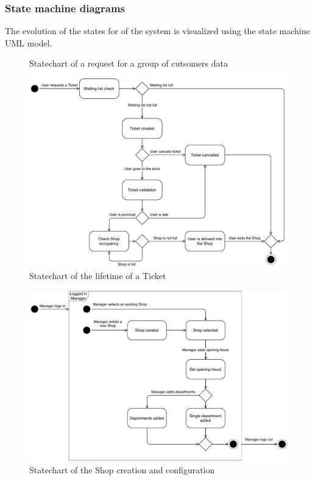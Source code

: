 \subsubsection{State machine diagrams}
{\todo
The evolution of the states for of the system is visualized using the state machine UML model.

    \begin{figure}[H]
        \caption{Statechart of a request for a group of cutsomers data}
        \label{fig:statemachine_grpreq}
    \end{figure}

    \begin{figure}[H]
        \includegraphics[width=\linewidth]{Images/state-diag_Ticket.pdf}
        \caption{Statechart of the lifetime of a Ticket}
        \label{fig:statemachine_specreq}
    \end{figure}

    \begin{figure}[H]
        \includegraphics[width=\linewidth]{Images/state-diag_Manager.pdf}
        \caption{Statechart of the Shop creation and configuration}
        \label{fig:statemachine_runevent}
    \end{figure}
}


